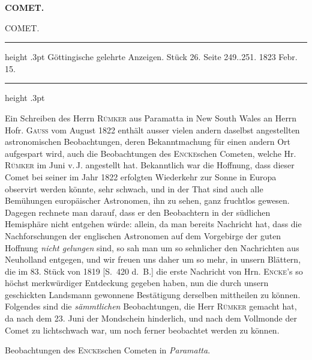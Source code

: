 \clearpage
\thispagestyle{empty}
\noindent{}%
%
\parbox[t]{\dimexpr\linewidth-24mm\relax}{\centering\footnotesize\bfseries COMET.\par}%
\makebox[12mm][r]{}\par\nobreak\medskip
\begin{center}
{\large COMET.}
\end{center}
\begin{center}
\parbox{.76\linewidth}{%
\centering\small
\hrule height .3pt\relax\vspace{2.5pt}
Göttingische gelehrte Anzeigen. Stück 26. Seite 249..251. 1823 Febr. 15.\par
\vspace{2.5pt}\hrule height .3pt\relax
}
\end{center}

Ein Schreiben des Herrn \textsc{Rümker} aus Paramatta in New South Wales an Herrn Hofr. \textsc{Gauss} vom
August 1822 enthält ausser vielen andern daselbst angestellten astronomischen Beobachtungen,
deren Bekanntmachung für einen andern Ort aufgespart wird, auch die Beobachtungen des
\textsc{Encke}schen Cometen, welche Hr. \textsc{Rümker} im Juni v.\,J. angestellt hat. Bekanntlich war die
Hoffnung, dass dieser Comet bei seiner im Jahr 1822 erfolgten Wiederkehr zur Sonne in Europa
observirt werden könnte, sehr schwach, und in der That sind auch alle Bemühungen europäischer
Astronomen, ihn zu sehen, ganz fruchtlos gewesen. Dagegen rechnete man darauf, dass er den
Beobachtern in der südlichen Hemisphäre nicht entgehen würde: allein, da man bereits Nachricht
hat, dass die Nachforschungen der englischen Astronomen auf dem Vorgebirge der guten Hoffnung
\emph{nicht gelungen} sind, so sah man um so sehnlicher den Nachrichten aus Neuholland entgegen,
und wir freuen uns daher um so mehr, in unsern Blättern, die im 83. Stück von 1819 [S.~420 d.~B.]
die erste Nachricht von Hrn. \textsc{Encke}'s so höchst merkwürdiger Entdeckung gegeben haben, nun die
durch unsern geschickten Landsmann gewonnene Bestätigung derselben mittheilen zu können.
Folgendes sind die \emph{sämmtlichen} Beobachtungen, die Herr \textsc{Rümker} gemacht hat, da nach dem
23. Juni der Mondschein hinderlich, und nach dem Vollmonde der Comet zu lichtschwach war, um
noch ferner beobachtet werden zu können.

\begin{center}
Beobachtungen des \textsc{Encke}schen Cometen in \emph{Paramatta}.
\end{center}

